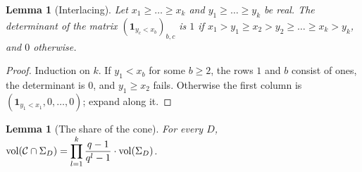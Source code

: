 \documentclass[10pt]{amsart}
\newtheorem{lemma}[theorem]{Lemma}
\theoremstyle{definition}
\theoremstyle{remark}
\begin{document}
\begin{lemma}[Interlacing]\label{pe:inter}
Let $x_1\ge\dots\ge x_k$ and $y_1\ge\dots\ge y_k$ be real. The determinant of the matrix
$(\mathbf 1_{y_c<x_b})_{b,c}$ is $1$ if $x_1>y_1\ge x_2>y_2\ge\dots\ge x_k>y_k$, and $0$ otherwise.
\end{lemma}
\begin{proof}
Induction on $k$. If $y_1<x_b$ for some $b\ge2$, the rows $1$ and $b$ consist of ones, the
determinant is $0$, and $y_1\ge x_2$ fails. Otherwise the first column is $(\mathbf
1_{y_1<x_1},0,\dots,0)$; expand along it.
\end{proof}

\begin{lemma}[The share of the cone]\label{pe:vol}
For every $D$, $\displaystyle\operatorname{vol}(\mathcal C\cap\Sigma_D)=\prod_{l=1}^{k}\frac{q-1}{q^l-1}\cdot
\operatorname{vol}(\Sigma_D)$.
\end{lemma}
\end{document}
